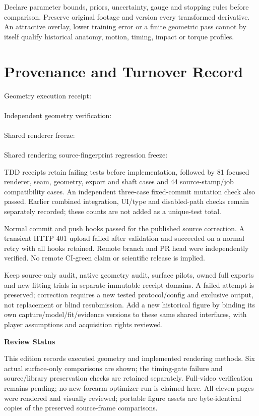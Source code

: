 \documentclass[11pt,letterpaper]{article}
\newcommand{\chapterpage}[1]{\clearpage\section{#1}}
\begin{document}
Declare parameter bounds, priors, uncertainty, gauge and stopping rules before
comparison. Preserve original footage and version every transformed derivative.
An attractive overlay, lower training error or a finite geometric pass cannot
by itself qualify historical anatomy, motion, timing, impact or torque profiles.
\chapterpage{Provenance and Turnover Record}
Geometry execution receipt:\\
\\
Independent geometry verification:\\
\\
Shared renderer freeze:\\
\\
Shared rendering source-fingerprint regression freeze:\\

TDD receipts retain failing tests before implementation, followed by 81 focused
renderer, seam, geometry, export and shaft cases and 44 source-stamp/job compatibility
cases. An independent three-case fixed-commit mutation check also passed.
Earlier combined integration, UI/type and disabled-path checks remain separately
recorded; these counts are not added as a unique-test total.

Normal commit and push hooks passed for the published source correction.
A transient HTTP 401 upload failed after validation and succeeded on a normal
retry with all hooks retained. Remote branch and PR head were independently
verified. No remote CI-green claim or scientific release is implied.

Keep source-only audit, native geometry audit, surface pilots, owned full
exports and new fitting trials in separate immutable receipt domains. A failed
attempt is preserved; correction requires a new tested protocol/config and
exclusive output, not replacement or blind resubmission. Add a new historical
figure by binding its own capture/model/fit/evidence versions to these same
shared interfaces, with player assumptions and acquisition rights reviewed.

\textbf{Review Status}\par
This edition records executed geometry and implemented rendering
methods. Six actual surface-only comparisons are shown; the timing-gate failure
and source/library preservation checks are retained separately. Full-video
verification remains pending; no new forearm optimizer run is claimed here. All eleven pages were rendered and visually reviewed; portable figure assets
are byte-identical copies of the preserved source-frame comparisons.
\end{document}
